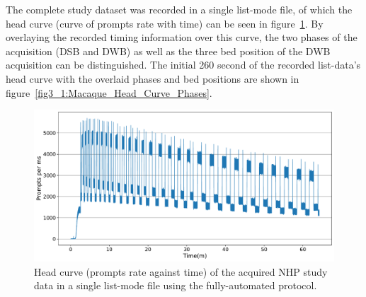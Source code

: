 The complete study dataset was recorded in a single list-mode file, of which the head curve (curve of prompts rate with time) can be seen in figure~\ref{fig3_1:Macaque_Head_Curve}. By overlaying the recorded timing information over this curve, the two phases of the acquisition (DSB and DWB) as well as the three bed position of the DWB acquisition can be distinguished. The initial 260 second of the recorded list-data's head curve with the overlaid phases and bed positions are shown in figure~\ref{fig3_1:Macaque_Head_Curve_Phases}. 

\begin{figure} [ht!]
\centering
\includegraphics[scale=0.45,angle=0]{3_Results/3_1_DWB_Optimization/figures/3_1_Macaque_Head_Curve.pdf}
\caption{Head curve (prompts rate against time) of the acquired NHP study data in a single list-mode file using the fully-automated protocol.}
\label{fig3_1:Macaque_Head_Curve}
\end{figure}

